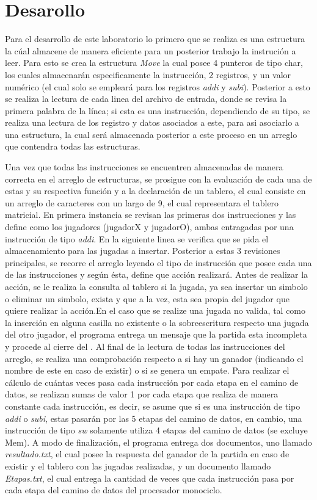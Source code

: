 \section{Desarollo}

\noindent Para el desarrollo de este laboratorio lo primero que se realiza es una estructura la cúal almacene de manera eficiente para un posterior trabajo la instrución a leer. Para esto se crea la estructura \textit{Move} la cual posee 4 punteros de tipo char, los cuales almacenarán especificamente la instrucción, 2 registros, y un valor numérico (el cual solo se empleará para los registros \textit{addi} y \textit{subi}).
Posterior a esto se realiza la lectura de cada linea del archivo de entrada, donde se revisa la primera palabra de la línea; si esta es una instrucción, dependiendo de su tipo, se realiza una lectura de los registro y datos asociados a este, para asi asociarlo a una estructura, la cual será almacenada posterior a este proceso en un arreglo que contendra todas las estructuras.

\noindent Una vez que todas las instrucciones se encuentren almacenadas de manera correcta en el arreglo de estructuras, se prosigue con la evaluación de cada una de estas y su respectiva función y a la declaración de un tablero, el cual consiste en un arreglo de caracteres con un largo de 9, el cual representara el tablero matricial. En primera instancia se revisan las primeras dos instrucciones y las define como los jugadores (jugadorX y jugadorO), ambas entragadas por una instrucción de tipo \textit{addi}. En la siguiente linea se verifica que se pida el almacenamiento para las jugadas a insertar. Posterior a estas 3 revisiones principales, se recorre el arreglo leyendo el tipo de instrucción que posee cada una de las instrucciones y según ésta, define que acción realizará. Antes de realizar la acción, se le realiza la consulta al tablero si la jugada, ya sea insertar un simbolo o eliminar un simbolo, exista y que a la vez, esta sea propia del jugador que quiere realizar la acción.En el caso que se realize una jugada no valida, tal como la inserción en alguna casilla no existente o la sobreescritura respecto una jugada del otro jugador, el programa entrega un mensaje que la partida esta incompleta y procede al cierre del . Al final de la lectura de todas las instrucciones del arreglo, se realiza una comprobación respecto a si hay un ganador (indicando el nombre de este en caso de existir) o si se genera un empate. Para realizar el cálculo de cuántas veces pasa cada instrucción por cada etapa en el camino de datos, se realizan sumas de valor 1 por cada etapa que realiza de manera constante cada instrucción, es decir, se asume que si es una instrucción de tipo \textit{addi} o \textit{subi}, estas pasarán por las 5 etapas del camino de datos, en cambio, una instrucción de tipo \textit{sw} solamente utiliza 4 etapas del camino de datos (se excluye Mem). A modo de finalización, el programa entrega dos documentos, uno llamado \textit{resultado.txt}, el cual posee la respuesta del ganador de la partida en caso de existir y el tablero con las jugadas realizadas, y un documento llamado \textit{Etapas.txt}, el cual entrega la cantidad de veces que cada instrucción pasa por cada etapa del camino de datos del procesador monociclo.


